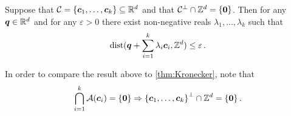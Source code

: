 \begin{theorem}
\label{thm:kp-density}
Suppose that $\mathcal{C} = \lbrace \boldsymbol{c}_{1}, \ldots, \boldsymbol{c}_{k} \rbrace \subseteq \mathbb{R}^{d}$ and that $\mathcal{C}^{\perp} \cap \mathbb{Z}^{d} = \lbrace \boldsymbol{0} \rbrace$. Then for any $\boldsymbol{q} \in \mathbb{R}^{d}$
and for any $\varepsilon > 0$ there exist non-negative reals $\lambda_{1}, \ldots, \lambda_{k}$ such that
\begin{equation*}
  \operatorname{dist}(\boldsymbol{q} + \sum\limits_{i=1}^{k} \lambda_{i} \boldsymbol{c}_{i}, \mathbb{Z}^{d}) \leq \varepsilon \, .
\end{equation*}
\end{theorem}
In order to compare the result above to \cref{thm:Kronecker}, note that
\begin{equation*}
  \bigcap\limits_{i=1}^{k} {\cal{A}}(\boldsymbol{c}_{i}) = \lbrace \boldsymbol{0} \rbrace
  \Rightarrow {\lbrace \boldsymbol{c}_{1}, \ldots, \boldsymbol{c}_{k} \rbrace}^{\perp} \cap \mathbb{Z}^{d} = \lbrace \boldsymbol{0} \rbrace \, .
\end{equation*}
